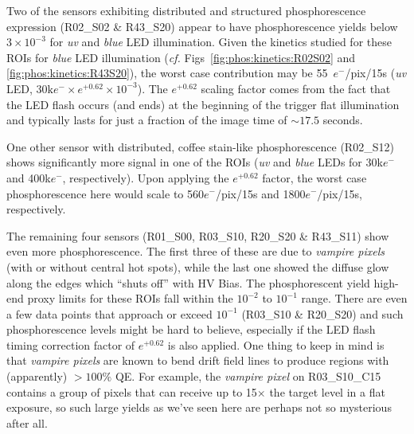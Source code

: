 Two of the sensors exhibiting distributed and structured phosphorescence expression (R02\_S02 \& R43\_S20) appear to have phosphorescence yields below $3\times 10^{-3}$ for {\it uv} and {\it blue} LED illumination. Given the kinetics studied for these ROIs for {\it blue} LED illumination ({\it cf.} Figs~\ref{fig:phos:kinetics:R02S02} and \ref{fig:phos:kinetics:R43S20}), the worst case contribution may be 55~$e^-$/pix/15s ({\it uv} LED, $30{\mathrm k}e^{-} \times e^{+0.62} \times 10^{-3}$). The $e^{+0.62}$ scaling factor comes from the fact that the LED flash occurs (and ends) at the beginning of the trigger flat illumination and typically lasts for just a fraction of the image time of $\sim17.5$ seconds.

One other sensor with distributed, coffee stain-like phosphorescence (R02\_S12) shows significantly more signal in one of the ROIs ({\it uv} and {\it blue} LEDs for 30k$e^-$ and 400k$e^-$, respectively). Upon applying the $e^{+0.62}$ factor, the worst case phosphorescence here would scale to 560$e^-$/pix/15s and 1800$e^-$/pix/15s, respectively.

The remaining four sensors (R01\_S00, R03\_S10, R20\_S20 \& R43\_S11) show even more phosphorescence. The first three of these are due to {\it vampire pixels} (with or without central hot spots), while the last one showed the diffuse glow along the edges which ``shuts off'' with HV Bias. The phosphorescent yield high-end proxy limits for these ROIs fall within the $10^{-2}$ to $10^{-1}$ range. There are even a few data points that approach or exceed $10^{-1}$ (R03\_S10 \& R20\_S20) and such phosphorescence levels might be hard to believe, especially if the LED flash timing correction factor of $e^{+0.62}$ is also applied. One thing to keep in mind is that {\it vampire pixels} are known to bend drift field lines to produce regions with (apparently) $>100\%$ QE. For example, the {\it vampire pixel} on R03\_S10\_C15 contains a group of pixels that can receive up to 15$\times$ the target level in a flat exposure, so such large yields as we've seen here are perhaps not so mysterious after all.

